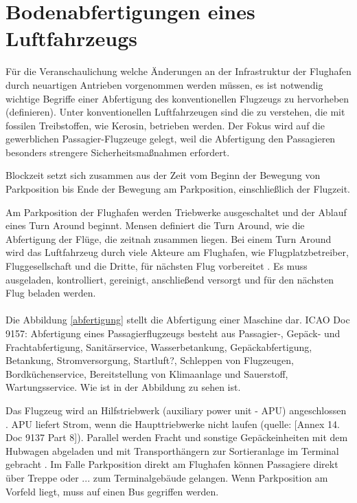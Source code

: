 \section{Bodenabfertigungen eines Luftfahrzeugs}
\label{s:Bodenabfertigungen eines Luftfahrzeugs}

Für die Veranschaulichung welche Änderungen an der Infrastruktur der Flughafen durch neuartigen Antrieben vorgenommen werden müssen, 
es ist notwendig wichtige Begriffe einer Abfertigung des konventionellen Flugzeugs zu hervorheben (definieren). 
Unter konventionellen Luftfahrzeugen sind die zu verstehen,
die mit fossilen Treibstoffen, wie Kerosin, betrieben werden. Der Fokus wird auf die gewerblichen Passagier-Flugzeuge gelegt,
weil die Abfertigung den Passagieren besonders strengere Sicherheitsmaßnahmen erfordert.


Blockzeit setzt sich zusammen aus der Zeit vom Beginn der Bewegung von Parkposition bis Ende der Bewegung am Parkposition, 
einschließlich der Flugzeit.

Am Parkposition der Flughafen werden Triebwerke ausgeschaltet und der Ablauf eines Turn Around beginnt. 
Mensen \cite{mensen2013handbuch} definiert die Turn Around, wie die Abfertigung der Flüge, die zeitnah zusammen liegen.
Bei einem Turn Around wird das Luftfahrzeug durch viele Akteure am Flughafen, wie Flugplatzbetreiber, Fluggesellschaft und die Dritte, für 
nächsten Flug vorbereitet \cite{mensen2013handbuch}. Es muss ausgeladen, kontrolliert, gereinigt, anschließend versorgt 
und für den nächsten Flug beladen werden. \\
\\
Die Abbildung \ref{abfertigung} stellt die Abfertigung einer Maschine dar.
ICAO Doc 9157: Abfertigung eines Passagierflugzeugs besteht aus Passagier-, Gepäck- und Frachtabfertigung, 
Sanitärservice, Wasserbetankung, Gepäckabfertigung, Betankung, Stromversorgung,
Startluft?, Schleppen von Flugzeugen, Bordküchenservice, Bereitstellung von Klimaanlage und Sauerstoff, Wartungsservice. 
Wie ist in der Abbildung zu sehen ist.

Das Flugzeug wird an Hilfstriebwerk (auxiliary power unit - APU) angeschlossen \cite{mensen2013handbuch}. 
APU liefert Strom, wenn die Haupttriebwerke nicht laufen (quelle: [Annex 14. Doc 9137 Part 8]).
Parallel werden Fracht und sonstige Gepäckeinheiten mit dem Hubwagen abgeladen und mit Transporthängern zur Sortieranlage 
im Terminal gebracht \cite{mensen2013handbuch}. Im Falle Parkposition direkt am Flughafen können Passagiere direkt über Treppe oder ... 
zum Terminalgebäude gelangen. Wenn Parkposition am Vorfeld liegt, muss auf einen Bus gegriffen werden. 


